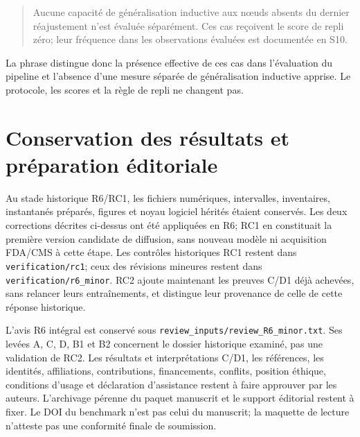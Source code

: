 \documentclass[10pt,a4paper]{article}
\newcommand{\src}[1]{{\small\nolinkurl{#1}}}
\begin{document}
\begin{quote}
Aucune capacité de généralisation inductive aux nœuds absents du dernier réajustement n'est évaluée séparément. Ces cas reçoivent le score de repli zéro; leur fréquence dans les observations évaluées est documentée en S10.
\end{quote}

La phrase distingue donc la présence effective de ces cas dans l'évaluation du pipeline et l'absence d'une mesure séparée de généralisation inductive apprise. Le protocole, les scores et la règle de repli ne changent pas.

\section{Conservation des résultats et préparation éditoriale}

Au stade historique R6/RC1, les fichiers numériques, intervalles, inventaires, instantanés préparés, figures et noyau logiciel hérités étaient conservés. Les deux corrections décrites ci-dessus ont été appliquées en R6; RC1 en constituait la première version candidate de diffusion, sans nouveau modèle ni acquisition FDA/CMS à cette étape. Les contrôles historiques RC1 restent dans \src{verification/rc1}; ceux des révisions mineures restent dans \src{verification/r6_minor}. RC2 ajoute maintenant les preuves C/D1 déjà achevées, sans relancer leurs entraînements, et distingue leur provenance de celle de cette réponse historique.

L'avis R6 intégral est conservé sous \src{review_inputs/review_R6_minor.txt}. Ses levées A, C, D, B1 et B2 concernent le dossier historique examiné, pas une validation de RC2. Les résultats et interprétations C/D1, les références, les identités, affiliations, contributions, financements, conflits, position éthique, conditions d'usage et déclaration d'assistance restent à faire approuver par les auteurs. L'archivage pérenne du paquet manuscrit et le support éditorial restent à fixer. Le DOI du benchmark n'est pas celui du manuscrit; la maquette de lecture n'atteste pas une conformité finale de soumission.
\end{document}

